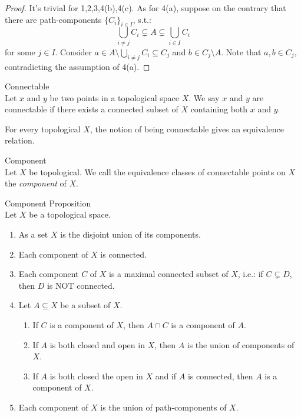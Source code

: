 \begin{proof}
    It's trivial for 1,2,3,4(b),4(c). As for 4(a), suppose on the contrary that there are path-components $\{C_i\}_{i \in I}$, s.t.:
    $$\bigcup_{i \neq j} C_i \subsetneq A \subsetneq \bigcup_{i\in I} C_i$$
    for some $j \in I$. Consider $a \in A \setminus \bigcup_{i \neq j} C_i \subseteq C_j$ and $b \in C_j \setminus A$. Note that $a,b \in C_j$, contradicting the assumption of 4(a).
\end{proof}

\begin{definition}{Connectable}\\
Let $x$ and $y$ be two points in a topological space $X$. We say $x$ and $y$ are connectable if there exists a connected subset of $X$ containing both $x$ and $y$.
\end{definition}

\begin{proposition}
    For every topological $X$, the notion of being connectable gives an equivalence relation.
\end{proposition}

\begin{definition}{Component}\\
Let $X$ be topological. We call the equivalence classes of connectable points on $X$ the \textit{component} of $X$.
\end{definition}

\begin{proposition}{Component Proposition}\\
Let $X$ be a topological space.
\begin{enumerate}
    \item As a set $X$ is the disjoint union of its components.
    \item Each component of $X$ is connected.
    \item Each component $C$ of $X$ is a maximal connected subset of $X$, i.e.: if $C \subsetneq D$, then $D$ is NOT connected.
    \item Let $A \subseteq X$ be a subset of $X$.
    \begin{enumerate}
        \item If $C$ is a component of $X$, then $A \cap C$ is a component of $A$.
        \item If $A$ is both closed and open in $X$, then $A$ is the union of components of $X$.
        \item If $A$ is both closed the open in $X$ and if $A$ is connected, then $A$ is a component of $X$.
    \end{enumerate}
    \item Each component of $X$ is the union of path-components of $X$.
\end{enumerate}
\end{proposition}

